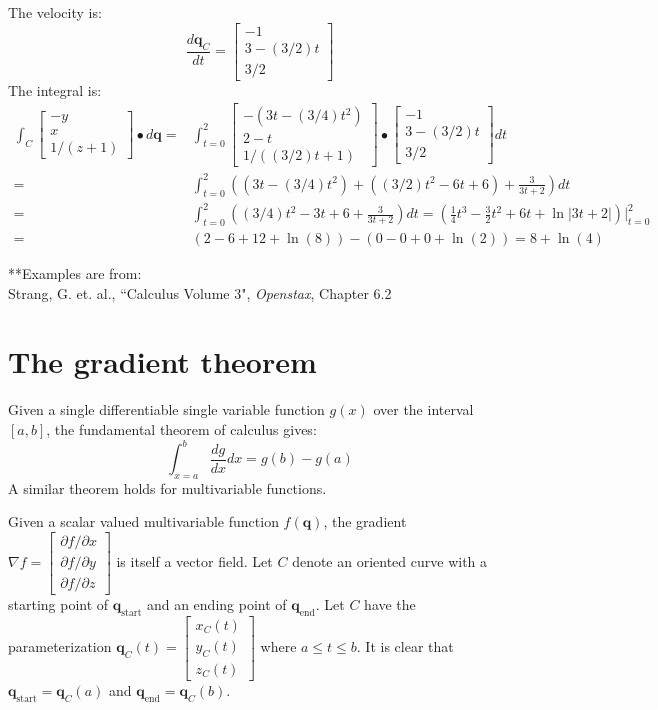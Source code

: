 \documentclass{article}
\begin{document}
\begin{itemize}
The velocity is:
\[\frac{d\mathbf{q}_C}{dt} = \begin{bmatrix} 
-1 \\ 3 - (3/2)t \\ 3/2  
\end{bmatrix}\]
The integral is:
\begin{align*}
\int_C \begin{bmatrix} -y \\ x \\ 1/(z + 1) \end{bmatrix} \bullet d\mathbf{q} 
= & \int_{t=0}^2 \begin{bmatrix} -(3t - (3/4)t^2) \\ 2 - t \\ 1/((3/2)t + 1) \end{bmatrix} \bullet \begin{bmatrix} 
-1 \\ 3 - (3/2)t \\ 3/2  
\end{bmatrix}dt \\ 
= & \int_{t=0}^2 ((3t - (3/4)t^2) + ((3/2)t^2 - 6t + 6) + \frac{3}{3t + 2})dt \\ 
= & \int_{t=0}^2 ((3/4)t^2 - 3t + 6 + \frac{3}{3t + 2})dt   
= (\frac{1}{4}t^3 - \frac{3}{2}t^2 + 6t + \ln|3t + 2|)\bigg|_{t=0}^2 \\ 
= & (2 - 6 + 12 + \ln(8)) - (0 - 0 + 0 + \ln(2)) 
= 8 + \ln(4)
\end{align*}

\end{itemize}
**Examples are from: \\
Strang, G. et. al., ``Calculus Volume 3", \emph{Openstax}, Chapter 6.2 





\section*{The gradient theorem}

Given a single differentiable single variable function \(g(x)\) over the interval \([a, b]\), the fundamental theorem of calculus gives:
\[\int_{x = a}^b \frac{dg}{dx}dx = g(b) - g(a)\]
A similar theorem holds for multivariable functions. 

Given a scalar valued multivariable function \(f(\mathbf{q})\), the gradient \(\nabla f = \begin{bmatrix} \partial f/\partial x \\ \partial f/\partial y \\ \partial f/\partial z \end{bmatrix}\) is itself a vector field. Let \(C\) denote an oriented curve with a starting point of \(\mathbf{q}_{\text{start}}\) and an ending point of \(\mathbf{q}_{\text{end}}\). Let \(C\) have the parameterization \(\mathbf{q}_C(t) = \begin{bmatrix} x_C(t) \\ y_C(t) \\ z_C(t) \end{bmatrix}\) where \(a \leq t \leq b\). It is clear that \(\mathbf{q}_{\text{start}} = \mathbf{q}_C(a)\) and \(\mathbf{q}_{\text{end}} = \mathbf{q}_C(b)\). 
\end{document}

